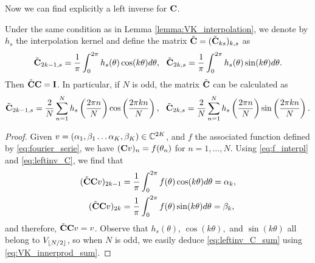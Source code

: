 Now we can find explicitly a left inverse for $\mathbf{C}$.
\begin{proposition}
  \label{proposition:expl-left-inverse}
  Under the same condition as in Lemma \ref{lemma:VK_interpolation}, we denote by $h_s$ the interpolation
  kernel and define the matrix
  $\tilde {\mathbf{C}}=(\tilde {\mathbf{C}}_{ks})_{k,s}$ as
  \begin{align}
    \label{eq:leftinv_C}
    \tilde {\mathbf{C}}_{2k-1,s} = \frac{1}{\pi}\int_0^{2\pi} h_s(\theta) \cos(k\theta) d\theta, \ \
    \tilde {\mathbf{C}}_{2k,s} = \frac{1}{\pi}\int_0^{2\pi} h_s(\theta) \sin(k\theta)
    d\theta.
  \end{align}
  Then $\tilde {\mathbf{C}} \mathbf{C} = \mathbf{I}$.  In particular, if $N$ is odd, the matrix $\tilde {\mathbf{C}}$ can be
  calculated as
  \begin{align}
    \label{eq:leftinv_C_sum}
    \tilde {\mathbf{C}}_{2k-1,s} = \frac{2}{N} \sum_{n=1}^{N}h_s\left( \frac {2\pi n}{N} \right)
    \cos\left( \frac{2\pi kn}{N} \right), \ \
    \tilde {\mathbf{C}}_{2k,s} = \frac{2}{N} \sum_{n=1}^{N}h_s\left( \frac {2\pi n}{N} \right) \sin\left( \frac{2\pi
    kn}{N} \right).
  \end{align}
\end{proposition}

\begin{proof}
  Given $v=(\alpha_1,\beta_1\ldots\alpha_K,\beta_K)\in\C^{2K}$, and $f$ the associated function
  defined by \eqref{eq:fourier_serie}, we have $(\mathbf{C} v)_n = f(\theta_n)$ for $n=1,\ldots, N$.
  Using \eqref{eq:f_interpl}
  and \eqref{eq:leftinv_C}, we find that
  \begin{align}
    \label{eq:CCv}
    (\tilde {\mathbf{C}}\mathbf{C} v)_{2k-1} &= \frac{1}{\pi}\int_0^{2\pi} f(\theta) \cos(k\theta) d\theta = \alpha_k, \\
    (\tilde {\mathbf{C}}\mathbf{C} v)_{2k} &= \frac{1}{\pi}\int_0^{2\pi} f(\theta) \sin(k\theta) d\theta =
    \beta_k,
  \end{align}
 and therefore, $\tilde {\mathbf{C}} \mathbf{C} v= v$.  Observe that $h_s(\theta)$, $\cos(k\theta),$ and $\sin(k\theta)$
  all belong to $V_{\lfloor N/2 \rfloor}$, so when $N$ is odd, we  easily deduce \eqref{eq:leftinv_C_sum}
  using \eqref{eq:VK_innerprod_sum}.
\end{proof}


